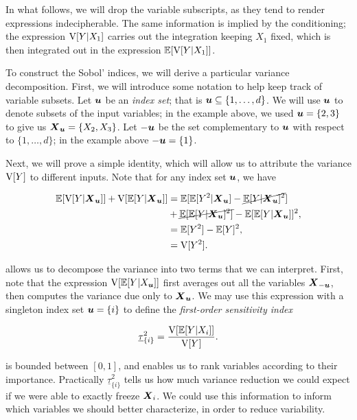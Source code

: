\documentclass{article}
\begin{document}
In what follows, we will drop the variable subscripts, as they tend to render
expressions indecipherable. The same information is implied by the conditioning;
the expression \(\mathrm{V}[Y|X_1]\) carries out the integration keeping \(X_1\) fixed,
which is then integrated out in the expression \(\mathbb{E}[\mathrm{V}[Y|X_1]]\).

To construct the Sobol' indices, we will derive a particular variance
decomposition. First, we will introduce some notation to help keep track of
variable subsets. Let \(\boldsymbol{u}\) be an \emph{index set}; that is
\(\boldsymbol{u}\subseteq\{1,\dots,d\}\). We will use \(\boldsymbol{u}\) to denote subsets of the
input variables; in the example above, we used \(\boldsymbol{u}=\{2,3\}\) to give us
\(\boldsymbol{X}_{\boldsymbol{u}}=\{X_2,X_3\}\). Let \(-\boldsymbol{u}\) be the set complementary to \(\boldsymbol{u}\) with
respect to \(\{1,\dots,d\}\); in the example above \(-\boldsymbol{u}=\{1\}\).

Next, we will prove a simple identity, which will allow us to attribute the
variance \(\mathrm{V}[Y]\) to different inputs. Note that for any index set \(\boldsymbol{u}\), we have

\begin{equation}\begin{aligned}\label{eq:var-decomp}
  \E[\V[Y|\mX_{\vu}]] + \V[\E[Y|\mX_{\vu}]] &= %
  \E[\E[Y^2|\mX_{\vu}] - \cancel{ \E[Y|\mX_{\vu}]^2 }] \\
  &+ \cancel{\E[\E[Y|\mX_{\vu}]^2]} - \E[\E[Y|\mX_{\vu}]]^2, \\
  &= \E[Y^2] - \E[Y]^2, \\
  &= \V[Y^2].
\end{aligned}\end{equation}

\noindent {} allows us to decompose the variance into two
terms that we can interpret. First, note that the expression
\(\mathrm{V}[\mathbb{E}[Y|X_{\boldsymbol{u}}]]\) first averages out all the variables \(\boldsymbol{X}_{-\boldsymbol{u}}\), then
computes the variance due only to \(\boldsymbol{X}_{\boldsymbol{u}}\). We may use this expression with
a singleton index set \(\boldsymbol{u}=\{i\}\) to define the \emph{first-order sensitivity
  index}

\begin{equation}\label{eq:sobol-first}
  \underline{\tau}_{\{i\}}^2 = \frac{\mathrm{V}[\mathbb{E}[Y|X_i]]}{\mathrm{V}[Y]}.
\end{equation}

\noindent {} is bounded between \([0,1]\), and enables us to
rank variables according to their importance. Practically
\(\underline{\tau}_{\{i\}}^2\) tells us how much variance reduction we could
expect if we were able to exactly freeze \(\boldsymbol{X}_i\). We could use this information
to inform which variables we should better characterize, in order to reduce
variability.
\end{document}
